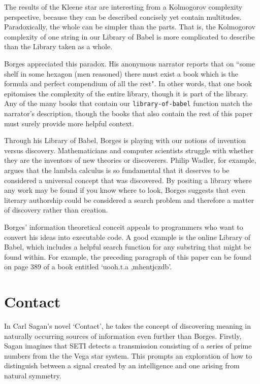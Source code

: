 \documentclass[numbers]{sigplanconf}
\begin{document}
The results of the Kleene star are interesting from a Kolmogorov complexity perspective, because they can be described
concisely yet contain multitudes. Paradoxically, the whole can be simpler than the parts.
That is, the Kolmogorov complexity of one string in our Library of Babel is more complicated to describe than the Library
taken as a whole.

Borges appreciated this paradox. His anonymous narrator reports that on ``some shelf in some hexagon (men reasoned)
there must exist a book which is the formula and perfect compendium of all the rest". In other words, that one book
epitomises the complexity of the entire library, though it is part of the library. Any of the many books that contain our
\verb|library-of-babel| function match the narrator's description, though the books that also contain the rest of this paper
must surely provide more helpful context.

Through his Library of Babel, Borges is playing with our notions of invention versus discovery. Mathematicians and computer
scientists struggle with whether they are the inventors of new theories or discoverers. Philip Wadler, for example,
argues that the lambda calculus is so fundamental that it deserves to be considered a universal concept that
was discovered\cite{Propositions as Types}. By positing a library where any work may be found if you know where to look, Borges
suggests that even literary authorship could be considered a search problem and therefore a matter of discovery rather than
creation.

Borges' information theoretical conceit appeals to programmers who want to convert his ideas into executable code.
A good example is the online Library of Babel, which includes a helpful search function for any substring that might be found
within\cite{Online Library of Babel}. For example, the preceding paragraph of this paper can be found on page 389 of a book
entitled `uooh.t.a ,mhentjczdb'.

\section{Contact}

In Carl Sagan's novel `Contact'\cite{Contact}, he takes the concept of discovering meaning in naturally occurring sources of
information even further than Borges. Firstly, Sagan imagines that SETI detects a transmission consisting of a series of prime
numbers from the the Vega star system. This prompts an exploration of how to distinguish between a signal created by an
intelligence and one arising from natural symmetry.
\end{document}
